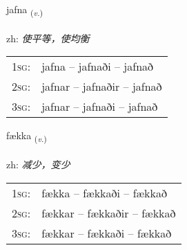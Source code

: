 \documentclass[frontgrid, backgrid]{flacards}\usepackage[]{graphicx}\usepackage[]{color}
\begin{document}
\renewcommand{\blhead}{\vskip5pt {\small\bfseries\footnotesize Sagnorð | 动词 }}
\renewcommand{\bcfoot}{\vskip5pt \hspace{2pt}{\small\bfseries\footnotesize 2K}}


{jafna \small{\textsubscript{(\textit{v.})}} \\[1ex] %
\textphonetic{[japna]} \\
zh: \emph{使平等，使均衡} \\  [2ex]
\renewcommand*{\arraystretch}{0.8}
\begin{tabular}{p{1cm}l}
\textsc{1sg}: & jafna -- jafnaði -- jafnað \\ 
\textsc{2sg}: & jafnar -- jafnaðir -- jafnað \\ 
\textsc{3sg}: & jafnar -- jafnaði -- jafnað \\ 
\end{tabular}
}

\renewcommand{\flhead}{\vskip5pt \fboxsep=0pt {\small\bfseries\footnotesize Sagnorð | 动词}}
\renewcommand{\fcfoot}{\vskip5pt \fboxsep=0pt \hspace{2pt}{\small\bfseries\footnotesize 2K}}

\renewcommand{\blhead}{\vskip5pt {\small\bfseries\footnotesize Sagnorð | 动词 }}
\renewcommand{\bcfoot}{\vskip5pt \hspace{2pt}{\small\bfseries\footnotesize 2K}}


{fækka \small{\textsubscript{(\textit{v.})}} \\[1ex] %
\textphonetic{[faihka]} \\
zh: \emph{减少，变少} \\  [2ex]
\renewcommand*{\arraystretch}{0.8}
\begin{tabular}{p{1cm}l}
\textsc{1sg}: & fækka -- fækkaði -- fækkað \\ 
\textsc{2sg}: & fækkar -- fækkaðir -- fækkað \\ 
\textsc{3sg}: & fækkar -- fækkaði -- fækkað \\ 
\end{tabular}
}
\end{document}
